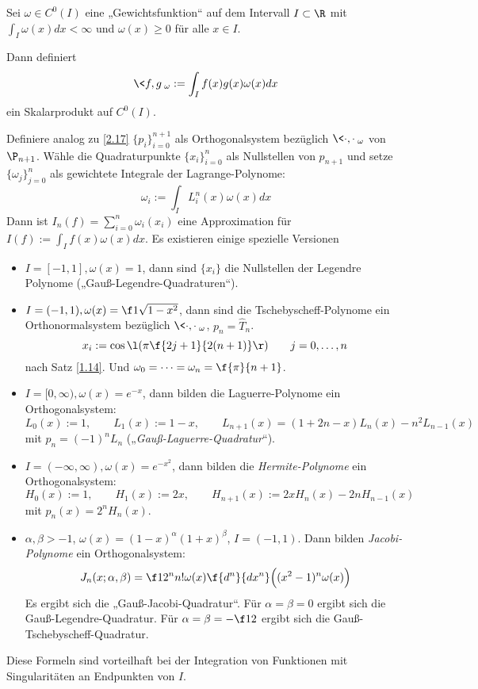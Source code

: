 \documentclass[11pt]{scrbook}
\begin{document}
\begin{nt*}
	Sei $\omega \in C^0(I)$ eine „Gewichtsfunktion“ auf dem Intervall $I\subset \R$ mit $\int_I \omega(x) dx < \infty$ und $\omega(x) \ge 0$ für alle $x\in I$.

	Dann definiert 
	\[
		\<f,g\>_\omega := \int_I f(x) g(x) \omega(x) dx
	\]
	ein Skalarprodukt auf $C^0(I)$.

	Definiere analog zu \ref{2.17} $\{p_i\}_{i=0}^{n+1}$ als Orthogonalsystem bezüglich $\<\cdot,\cdot\>_\omega$ von $\P_{n+1}$.
	Wähle die Quadraturpunkte $\{x_i\}_{i=0}^n$ als Nullstellen von $p_{n+1}$ und setze $\{\omega_j\}_{j=0}^n$ als gewichtete Integrale der Lagrange-Polynome:
	\[
		\omega_i := \int_I L_i^n(x) \omega(x) dx
	\]
	Dann ist $I_n(f) = \sum_{i=0}^n\omega_i (x_i)$ eine Approximation für $I(f) := \int_I f(x) \omega(x) dx$.
	Es existieren einige spezielle Versionen
	\begin{itemize}
		\item
			$I=[-1,1], \omega(x) =1$, dann sind $\{x_i\}$ die Nullstellen der Legendre Polynome („Gauß-Legendre-Quadraturen“).
		\item
			$I=(-1,1), \omega(x) = \f 1{\sqrt{1-x^2}}$, dann sind die Tschebyscheff-Polynome ein Orthonormalsystem bezüglich $\<\cdot,\cdot\>_\omega$, $p_n= \hat T_n$.
			\[
				x_i := \cos \l(\pi \f {2j+1}{2(n+1)}\r) \qquad j= 0,\dotsc, n
			\]
			nach Satz \ref{1.14}. Und $\omega_0 = \dotsb = \omega_n = \f {\pi}{n+1}$.
		\item
			$I=[0,\infty), \omega(x) = e^{-x}$, dann bilden die Laguerre-Polynome ein Orthogonalsystem:
			\[
				L_0(x) := 1, \qquad L_1(x) := 1-x, \qquad L_{n+1}(x) = (1+2n-x)L_n(x) - n^2 L_{n-1}(x)
			\]
			mit $p_n = (-1)^n L_n$ („\emph{Gauß-Laguerre-Quadratur}“).
		\item
			$I=(-\infty,\infty), \omega(x) = e^{-x^2}$, dann bilden die \emph{Hermite-Polynome} ein Orthogonalsystem:
			\[
				H_0(x) := 1, \qquad H_1(x) := 2x, \qquad H_{n+1}(x) := 2xH_n(x) - 2nH_{n-1}(x)
			\]
			mit $p_n(x)=2^n H_n(x)$.
		\item
			$\alpha, \beta > -1$, $\omega(x) = (1-x)^\alpha (1+x)^\beta$, $I=(-1,1)$.
			Dann bilden \emph{Jacobi-Polynome} ein Orthogonalsystem:
			\[
				J_n(x;\alpha,\beta) = \f 1{2^n n! \omega(x)}\f {d^n}{dx^n}\Big( (x^2-1)^n \omega(x)\Big)
			\]
			Es ergibt sich die „Gauß-Jacobi-Quadratur“.
			Für $\alpha=\beta=0$ ergibt sich die Gauß-Legendre-Quadratur.
			Für $\alpha=\beta= -\f 12$ ergibt sich die Gauß-Tschebyscheff-Quadratur.
	\end{itemize}
	Diese Formeln sind vorteilhaft bei der Integration von Funktionen mit Singularitäten an Endpunkten von $I$.
\end{nt*}
\end{document}

